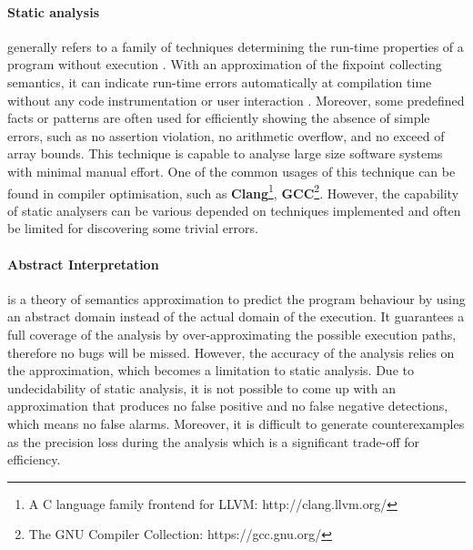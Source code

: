 




\paragraph{Static analysis} generally refers to a family of techniques determining the run-time properties of a program without execution \cite{4544862}. With an approximation of the fixpoint collecting semantics, it can indicate run-time errors automatically at compilation time without any code instrumentation or user interaction \cite{vorobyov2010comparing, CousotEtAl10-FMSD}. Moreover, some predefined facts or patterns are often used for efficiently showing the absence of simple errors, such as no assertion violation, no arithmetic overflow, and no exceed of array bounds. This technique is capable to analyse large size software systems with minimal manual effort. One of the common usages of this technique can be found in compiler optimisation, such as \textbf{Clang}\footnote{A C language family frontend for LLVM: http://clang.llvm.org/}, \textbf{GCC}\footnote{The GNU Compiler Collection: https://gcc.gnu.org/}. However, the capability of static analysers can be various depended on techniques implemented and often be limited for discovering some trivial errors.

\paragraph{Abstract Interpretation} is a theory of semantics approximation to predict the program behaviour by using an abstract domain instead of the actual domain of the execution\cite{4544862}. It guarantees a full coverage of the analysis by over-approximating the possible execution paths, therefore no bugs will be missed\cite{CousotCousot09-Marktoberdorf}. However, the accuracy of the analysis relies on the approximation, which becomes a limitation to static analysis. Due to undecidability of static analysis, it is not possible to come up with an approximation that produces no false positive and no false negative detections, which means no false alarms\cite{4544862}. Moreover, it is difficult to generate counterexamples as the precision loss during the analysis which is a significant trade-off for efficiency.

